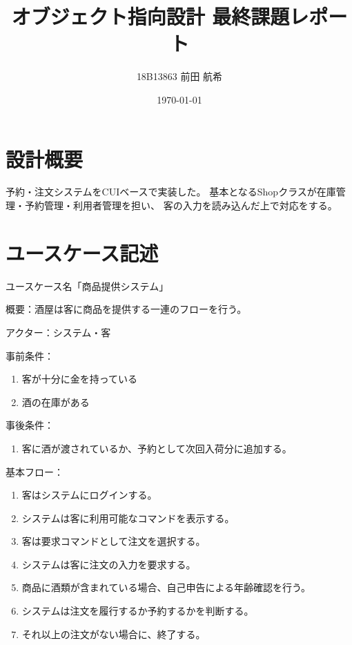 \documentclass[a4paper,11pt]{jsarticle}
\begin{document}
\title{オブジェクト指向設計 最終課題レポート}
\author{18B13863 前田 航希}
\date{\today}
\maketitle

\newpage
\tableofcontents
\newpage

\section{設計概要}

予約・注文システムをCUIベースで実装した。
基本となるShopクラスが在庫管理・予約管理・利用者管理を担い、
客の入力を読み込んだ上で対応をする。

\section{ユースケース記述}
ユースケース名「商品提供システム」

概要：酒屋は客に商品を提供する一連のフローを行う。

アクター：システム・客

事前条件：
\begin{enumerate}
    \item 客が十分に金を持っている
    \item 酒の在庫がある
\end{enumerate}

事後条件：

\begin{enumerate}
    \item 客に酒が渡されているか、予約として次回入荷分に追加する。
\end{enumerate}

基本フロー：
\begin{enumerate}
    \item 客はシステムにログインする。
    \item システムは客に利用可能なコマンドを表示する。
    \item 客は要求コマンドとして注文を選択する。
    \item システムは客に注文の入力を要求する。
    \item 商品に酒類が含まれている場合、自己申告による年齢確認を行う。
    \item システムは注文を履行するか予約するかを判断する。
    \item それ以上の注文がない場合に、終了する。
\end{enumerate}
\end{document}
